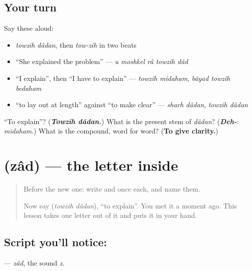 \subsection*{Your turn}
Say these aloud:

\begin{itemize}
\raggedright
  \item \emph{towzih dâdan}, then \emph{tow-zih} in two beats
  \item \textquotedblleft{}She explained the problem\textquotedblright{} — \emph{u moshkel râ towzih dâd}
  \item \textquotedblleft{}I explain\textquotedblright{}, then \textquotedblleft{}I have to explain\textquotedblright{} — \emph{towzih midaham}, \emph{bâyad towzih bedaham}
  \item \textquotedblleft{}to lay out at length\textquotedblright{} against \textquotedblleft{}to make clear\textquotedblright{} — \emph{sharh dâdan}, \emph{towzih dâdan}
\end{itemize}

\begin{tcolorbox}[breakable,colback=teal!4,colframe=teal!35!black,title={Before you move on}]
\textquotedblleft{}To explain\textquotedblright{}? (\emph{\textbf{Towzih dâdan.}}) What is the present stem of \emph{dâdan}? (\emph{\textbf{Deh-}}: \emph{midaham}.) What is the compound, word for word? (\textbf{To give clarity.})
\end{tcolorbox}
\section[\texorpdfstring{\fa{ض} (zâd)}{ض (zâd)}]{ (zâd) — the letter inside }

\label{lesson:FA-W293-zad}



\begin{quote}
Before the new one: write  and  once each, and name them.

Now say \textbf{ } (\emph{towzih dâdan}), \textquotedblleft{}to explain\textquotedblright{}. You met it a moment ago. This lesson takes one letter out of it and puts it in your hand.
\end{quote}

\subsection*{Script you'll notice: }
\textbf{} — \emph{zâd}, the sound \emph{z}.

